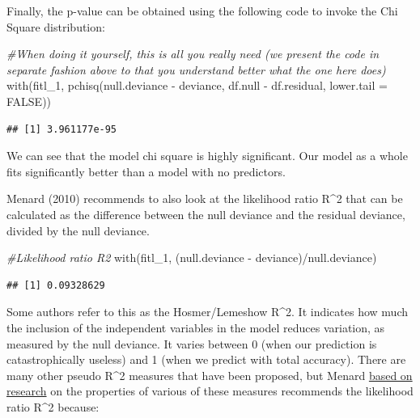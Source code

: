 \documentclass[
]{book}
\newenvironment{Shaded}{\begin{snugshade}}{\end{snugshade}}
\newcommand{\AttributeTok}[1]{\textcolor[rgb]{0.77,0.63,0.00}{#1}}
\newcommand{\CommentTok}[1]{\textcolor[rgb]{0.56,0.35,0.01}{\textit{#1}}}
\newcommand{\ConstantTok}[1]{\textcolor[rgb]{0.00,0.00,0.00}{#1}}
\newcommand{\FunctionTok}[1]{\textcolor[rgb]{0.00,0.00,0.00}{#1}}
\newcommand{\NormalTok}[1]{#1}
\newcommand{\SpecialCharTok}[1]{\textcolor[rgb]{0.00,0.00,0.00}{#1}}
\begin{document}
Finally, the p-value can be obtained using the following code to invoke the Chi Square distribution:

\begin{Shaded}
\begin{Highlighting}[]
\CommentTok{\#When doing it yourself, this is all you really need (we present the code in separate fashion above to that you understand better what the one here does)}
\FunctionTok{with}\NormalTok{(fitl\_1, }\FunctionTok{pchisq}\NormalTok{(null.deviance }\SpecialCharTok{{-}}\NormalTok{ deviance, df.null }\SpecialCharTok{{-}}\NormalTok{ df.residual, }\AttributeTok{lower.tail =} \ConstantTok{FALSE}\NormalTok{))}
\end{Highlighting}
\end{Shaded}

\begin{verbatim}
## [1] 3.961177e-95
\end{verbatim}

We can see that the model chi square is highly significant. Our model as a whole fits significantly better than a model with no predictors.

Menard (2010) recommends to also look at the likelihood ratio R\^{}2 that can be calculated as the difference between the null deviance and the residual deviance, divided by the null deviance.

\begin{Shaded}
\begin{Highlighting}[]
\CommentTok{\#Likelihood ratio R2}
\FunctionTok{with}\NormalTok{(fitl\_1, (null.deviance }\SpecialCharTok{{-}}\NormalTok{ deviance)}\SpecialCharTok{/}\NormalTok{null.deviance)}
\end{Highlighting}
\end{Shaded}

\begin{verbatim}
## [1] 0.09328629
\end{verbatim}

Some authors refer to this as the Hosmer/Lemeshow R\^{}2. It indicates how much the inclusion of the independent variables in the model reduces variation, as measured by the null deviance. It varies between 0 (when our prediction is catastrophically useless) and 1 (when we predict with total accuracy). There are many other pseudo R\^{}2 measures that have been proposed, but Menard \href{http://www.tandfonline.com/doi/pdf/10.1080/00031305.2000.10474502}{based on research} on the properties of various of these measures recommends the likelihood ratio R\^{}2 because:
\end{document}
